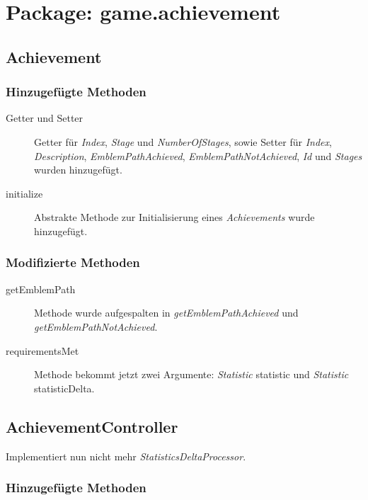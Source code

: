 \section{Package: game.achievement}

\subsection{Achievement}

\subsubsection{Hinzugefügte Methoden}

\begin{description}
	\item[Getter und Setter]
	Getter für \emph{Index}, \emph{Stage} und \emph{NumberOfStages}, sowie Setter für \emph{Index}, \emph{Description}, \emph{EmblemPathAchieved}, \emph{EmblemPathNotAchieved}, \emph{Id} und \emph{Stages} wurden hinzugefügt.
	
	\item[initialize]
	Abstrakte Methode zur Initialisierung eines \emph{Achievements} wurde hinzugefügt.

	
\end{description}



\subsubsection{Modifizierte Methoden}

\begin{description}
	\item[getEmblemPath]
	Methode wurde aufgespalten in \emph{getEmblemPathAchieved} und \emph{getEmblemPathNotAchieved}.
	
	\item[requirementsMet]
	Methode bekommt jetzt zwei Argumente: \emph{Statistic} statistic und \emph{Statistic} statisticDelta.
\end{description}


\subsection{AchievementController}
Implementiert nun nicht mehr \emph{StatisticsDeltaProcessor}.

\subsubsection{Hinzugefügte Methoden}

